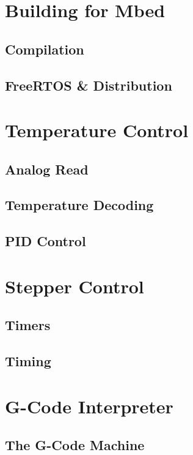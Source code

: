 	\section{Building for Mbed}
		
		\subsection{Compilation}
		
		\subsection{FreeRTOS \& \uIP{} Distribution}
	
	\section{Temperature Control}
		
		\subsection{Analog Read}
		
		\subsection{Temperature Decoding}
		
		\subsection{PID Control}
	
	\section{Stepper Control}
		
		\subsection{Timers}
		
		\subsection{Timing}
	
	\section{G-Code Interpreter}
		
		\subsection{The G-Code Machine}
		
